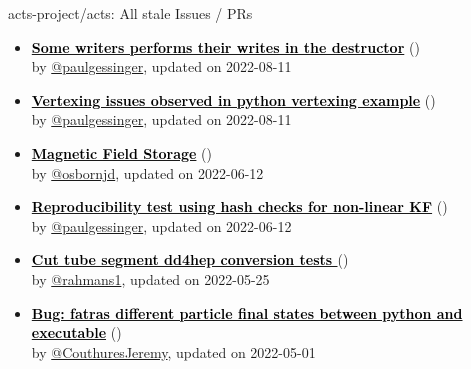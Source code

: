 \begin{frame}[allowframebreaks]{ acts-project/acts: All stale Issues / PRs}
\begin{itemize}
    \item\iss\prstale\textbf{\href{https://github.com/acts-project/acts/issues/881}{\textcolor{black}{Some writers performs their writes in the destructor}}}
    (\href{https://github.com/acts-project/acts/issues/881}{}) \\
    by \href{https://github.com/paulgessinger}{@paulgessinger}, updated on 2022-08-11

    \item\iss\prstale\textbf{\href{https://github.com/acts-project/acts/issues/1091}{\textcolor{black}{Vertexing issues observed in python vertexing example}}}
    (\href{https://github.com/acts-project/acts/issues/1091}{}) \\
    by \href{https://github.com/paulgessinger}{@paulgessinger}, updated on 2022-08-11

    \item\iss\prstale\textbf{\href{https://github.com/acts-project/acts/issues/1239}{\textcolor{black}{Magnetic Field Storage}}}
    (\href{https://github.com/acts-project/acts/issues/1239}{}) \\
    by \href{https://github.com/osbornjd}{@osbornjd}, updated on 2022-06-12

    \item\iss\prstale\textbf{\href{https://github.com/acts-project/acts/issues/1246}{\textcolor{black}{Reproducibility test using hash checks for non-linear KF}}}
    (\href{https://github.com/acts-project/acts/issues/1246}{}) \\
    by \href{https://github.com/paulgessinger}{@paulgessinger}, updated on 2022-06-12

    \item\iss\prstale\textbf{\href{https://github.com/acts-project/acts/issues/1146}{\textcolor{black}{Cut tube segment dd4hep conversion tests }}}
    (\href{https://github.com/acts-project/acts/issues/1146}{}) \\
    by \href{https://github.com/rahmans1}{@rahmans1}, updated on 2022-05-25

    \item\iss\prstale\textbf{\href{https://github.com/acts-project/acts/issues/1221}{\textcolor{black}{Bug: fatras different particle final states between python and executable}}}
    (\href{https://github.com/acts-project/acts/issues/1221}{}) \\
    by \href{https://github.com/CouthuresJeremy}{@CouthuresJeremy}, updated on 2022-05-01


\end{itemize}
\end{frame}
